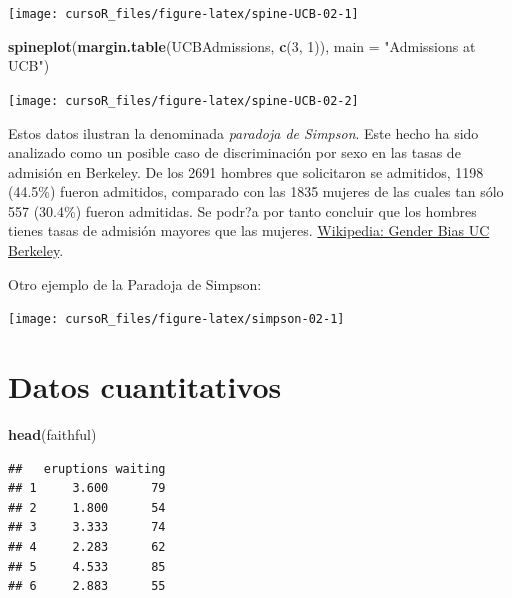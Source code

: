 \documentclass[]{book}
\newenvironment{Shaded}{\begin{snugshade}}{\end{snugshade}}
\newcommand{\KeywordTok}[1]{\textcolor[rgb]{0.13,0.29,0.53}{\textbf{#1}}}
\newcommand{\DataTypeTok}[1]{\textcolor[rgb]{0.13,0.29,0.53}{#1}}
\newcommand{\DecValTok}[1]{\textcolor[rgb]{0.00,0.00,0.81}{#1}}
\newcommand{\StringTok}[1]{\textcolor[rgb]{0.31,0.60,0.02}{#1}}
\newcommand{\NormalTok}[1]{#1}
\begin{document}
\begin{center}\texttt{[image: cursoR\_files/figure-latex/spine-UCB-02-1]} \end{center}

\begin{Shaded}
\begin{Highlighting}[]
\KeywordTok{spineplot}\NormalTok{(}\KeywordTok{margin.table}\NormalTok{(UCBAdmissions, }\KeywordTok{c}\NormalTok{(}\DecValTok{3}\NormalTok{, }\DecValTok{1}\NormalTok{)),}
           \DataTypeTok{main =} \StringTok{"Admissions at UCB"}\NormalTok{)}
\end{Highlighting}
\end{Shaded}

\begin{center}\texttt{[image: cursoR\_files/figure-latex/spine-UCB-02-2]} \end{center}

Estos datos ilustran la denominada \emph{paradoja de Simpson}. Este
hecho ha sido analizado como un posible caso de discriminación por sexo
en las tasas de admisión en Berkeley. De los 2691 hombres que
solicitaron se admitidos, 1198 (44.5\%) fueron admitidos, comparado con
las 1835 mujeres de las cuales tan sólo 557 (30.4\%) fueron admitidas.
Se podr?a por tanto concluir que los hombres tienes tasas de admisión
mayores que las mujeres.
\href{https://en.wikipedia.org/wiki/Simpson\%27s_paradox\#UC_Berkeley_gender_bias}{Wikipedia:
Gender Bias UC Berkeley}.

Otro ejemplo de la Paradoja de Simpson:

\begin{center}\texttt{[image: cursoR\_files/figure-latex/simpson-02-1]} \end{center}

\section{Datos cuantitativos}\label{datos-cuantitativos}

\begin{Shaded}
\begin{Highlighting}[]
\KeywordTok{head}\NormalTok{(faithful)}
\end{Highlighting}
\end{Shaded}

\begin{verbatim}
##   eruptions waiting
## 1     3.600      79
## 2     1.800      54
## 3     3.333      74
## 4     2.283      62
## 5     4.533      85
## 6     2.883      55
\end{verbatim}
\end{document}
